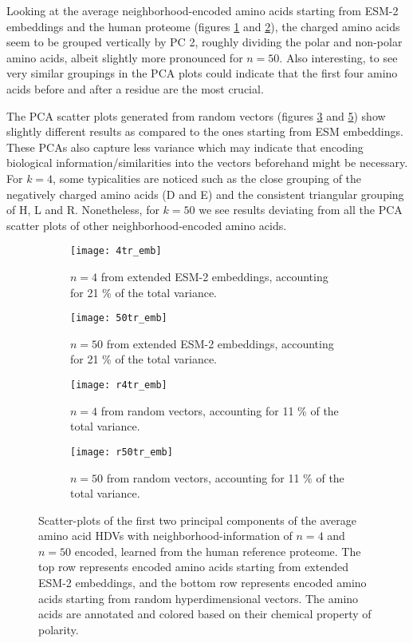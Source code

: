Looking at the average neighborhood-encoded amino acids starting from ESM-2 embeddings and the human proteome (figures \ref{fig:AAtr4} and \ref{fig:AAtr50}), the charged amino acids seem to be grouped vertically by PC 2, roughly dividing the polar and non-polar amino acids, albeit slightly more pronounced for $n = 50$. Also interesting, to see very similar groupings in the PCA plots could indicate that the first four amino acids before and after a residue are the most crucial.

The PCA scatter plots generated from random vectors (figures \ref{fig:AArtr4} and \ref{fig:AArtr50}) show slightly different results as compared to the ones starting from ESM embeddings. These PCAs also capture less variance which may indicate that encoding biological information/similarities into the vectors beforehand might be necessary. For $k = 4$, some typicalities are noticed such as the close grouping of the negatively charged amino acids (D and E) and the consistent triangular grouping of H, L and R. Nonetheless, for $k = 50$ we see results deviating from all the PCA scatter plots of other neighborhood-encoded amino acids.

\begin{figure}[H]
    \label{fig:bigfig}
    \centering
    \begin{subfigure}[b]{0.45\textwidth}
        \texttt{[image: 4tr\_emb]}
        \caption{$n = 4$ from extended ESM-2 embeddings, accounting for 21 \% of the total variance.}
        \label{fig:AAtr4}
    \end{subfigure}
    \hfill
    \begin{subfigure}[b]{0.45\textwidth}
        \texttt{[image: 50tr\_emb]}
        \caption{$n = 50$ from extended ESM-2 embeddings, accounting for 21 \% of the total variance.}
        \label{fig:AAtr50}
    \end{subfigure}
    \vspace{10pt} %
    \begin{subfigure}[b]{0.45\textwidth}
        \texttt{[image: r4tr\_emb]}
        \caption{$n = 4$ from random vectors, accounting for 11 \% of the total variance.}
        \label{fig:AArtr4}
    \end{subfigure}
    \hfill
    \begin{subfigure}[b]{0.45\textwidth}
        \texttt{[image: r50tr\_emb]}
        \caption{$n = 50$ from random vectors, accounting for 11 \% of the total variance.}
        \label{fig:AArtr50}
    \end{subfigure}
    \caption{Scatter-plots of the first two principal components of the average amino acid HDVs with neighborhood-information of $n = 4$ and $n = 50$ encoded, learned from the human reference proteome. The top row represents encoded amino acids starting from extended ESM-2 embeddings, and the bottom row represents encoded amino acids starting from random hyperdimensional vectors. The amino acids are annotated and colored based on their chemical property of polarity.}
\end{figure}

